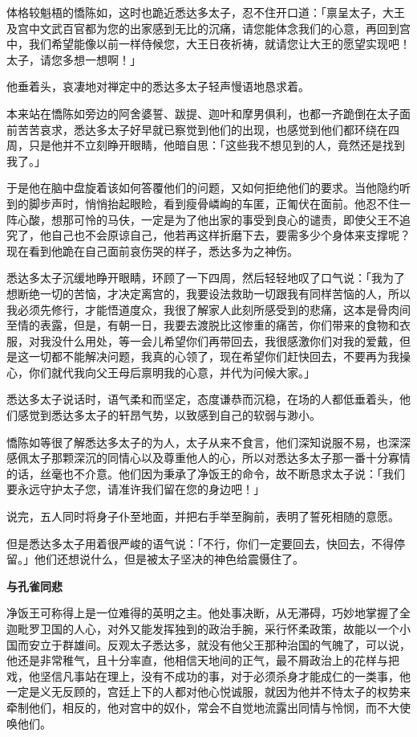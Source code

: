 \documentclass[twoside,openany]{book}
\newcommand{\mt}[1]{\textbullet \textbf{#1}}
\begin{document}
体格较魁梧的憍陈如，这时也跪近悉达多太子，忍不住开口道：「禀呈太子，大王及宫中文武百官都为您的出家感到无比的沉痛，请您能体念我们的心意，再回到宫中，我们希望能像以前一样侍候您，大王日夜祈祷，就请您让大王的愿望实现吧！太子，请您多想一想啊！」

他垂着头，哀凄地对禅定中的悉达多太子轻声慢语地恳求着。

本来站在憍陈如旁边的阿舍婆誓、跋提、迦叶和摩男俱利，也都一齐跪倒在太子面前苦苦哀求，悉达多太子好早就已察觉到他们的出现，也感觉到他们都环绕在四周，只是他并不立刻睁开眼睛，他暗自思：「这些我不想见到的人，竟然还是找到我了。」

于是他在脑中盘旋着该如何答覆他们的问题，又如何拒绝他们的要求。当他隐约听到的脚步声时，悄悄抬起眼睑，看到瘦骨嶙峋的车匿，正匍伏在面前。他忍不住一阵心酸，想那可怜的马伕，一定是为了他出家的事受到良心的谴责，即使父王不追究了，他自己也不会原谅自己，他若再这样折磨下去，要需多少个身体来支撑呢？现在看到他跪在自己面前哀伤哭的样子，悉达多为之神伤。

悉达多太子沉缓地睁开眼睛，环顾了一下四周，然后轻轻地叹了口气说：「我为了想断绝一切的苦恼，才决定离宫的，我要设法救助一切跟我有同样苦恼的人，所以我必须先修行，才能悟道度众，我很了解家人此刻所感受到的悲痛，这本是骨肉间至情的表露，但是，有朝一日，我要去渡脱比这惨重的痛苦，你们带来的食物和衣服，对我没什么用处，等一会儿希望你们再带回去，我很感激你们对我的爱戴，但是这一切都不能解决问题，我真的心领了，现在希望你们赶快回去，不要再为我操心，你们就代我向父王母后禀明我的心意，并代为问候大家。」

悉达多太子说话时，语气柔和而坚定，态度谦恭而沉稳，在场的人都低垂着头，他们感觉到悉达多太子的轩昂气势，以致感到自己的软弱与渺小。

憍陈如等很了解悉达多太子的为人，太子从来不食言，他们深知说服不易，也深深感佩太子那颗深沉的同情心以及尊重他人的心，所以对悉达多太子那一番十分寡情的话，丝毫也不介意。他们因为秉承了净饭王的命令，故不断恳求太子说：「我们要永远守护太子您，请准许我们留在您的身边吧！」

说完，五人同时将身子仆至地面，并把右手举至胸前，表明了誓死相随的意愿。

但是悉达多太子用着很严峻的语气说：「不行，你们一定要回去，快回去，不得停留。」他们还想说什么，但是被太子坚决的神色给震慑住了。

\mt{与孔雀同悲}

净饭王可称得上是一位难得的英明之主。他处事决断，从无滞碍，巧妙地掌握了全迦毗罗卫国的人心，对外又能发挥独到的政治手腕，采行怀柔政策，故能以一个小国而安立于群雄间。反观太子悉达多，就没有他父王那种治国的气魄了，可以说，他还是非常稚气，且十分率直，他相信天地间的正气，最不屑政治上的花样与把戏，他坚信凡事站在理上，没有不成功的事，对于必须杀身才能成仁的一类事，他一定是义无反顾的，宫廷上下的人都对他心悦诚服，就因为他并不恃太子的权势来牵制他们，相反的，他对宫中的奴仆，常会不自觉地流露出同情与怜悯，而不大使唤他们。
\end{document}

